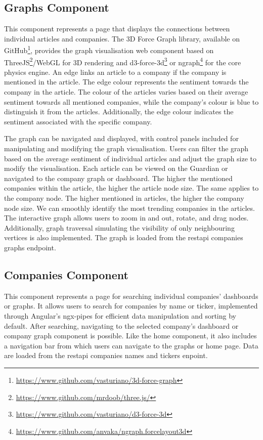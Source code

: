 \subsection{Graphs Component}
\label{subsec:frontend-graphs}
This component represents a page that displays the connections between individual articles and companies. The 3D Force Graph library, available on GitHub\footnote{\href{https://www.github.com/vasturiano/3d-force-graph}{https://www.github.com/vasturiano/3d-force-graph}}, provides the graph visualisation web component based on ThreeJS\footnote{\href{https://www.github.com/mrdoob/three.js/}{https://www.github.com/mrdoob/three.js/}}/WebGL for 3D rendering and d3-force-3d\footnote{\href{https://www.github.com/vasturiano/d3-force-3d}{https://www.github.com/vasturiano/d3-force-3d}} or ngraph\footnote{\href{https://www.github.com/anvaka/ngraph.forcelayout3d}{https://www.github.com/anvaka/ngraph.forcelayout3d}} for the core physics engine. An edge links an article to a company if the company is mentioned in the article. The edge colour represents the sentiment towards the company in the article. The colour of the articles varies based on their average sentiment towards all mentioned companies, while the company's colour is blue to distinguish it from the articles. Additionally, the edge colour indicates the sentiment associated with the specific company. 

The graph can be navigated and displayed, with control panels included for manipulating and modifying the graph visualisation. Users can filter the graph based on the average sentiment of individual articles and adjust the graph size to modify the visualisation. Each article can be viewed on the Guardian or navigated to the company graph or dashboard. The higher the mentioned companies within the article, the higher the article node size. The same applies to the company node. The higher mentioned in articles, the higher the company node size. We can smoothly identify the most trending companies in the articles. The interactive graph allows users to zoom in and out, rotate, and drag nodes. Additionally, graph traversal simulating the visibility of only neighbouring vertices is also implemented. The graph is loaded from the \acrshort{restapi} companies graphs endpoint.

\subsection{Companies Component}
\label{subsec:frontend-companies}
This component represents a page for searching individual companies' dashboards or graphs. It allows users to search for companies by name or ticker, implemented through Angular's ngx-pipes for efficient data manipulation and sorting by default. After searching, navigating to the selected company's dashboard or company graph component is possible. Like the home component, it also includes a navigation bar from which users can navigate to the graphs or home page. Data are loaded from the \acrshort{restapi} companies names and tickers enpoint.

